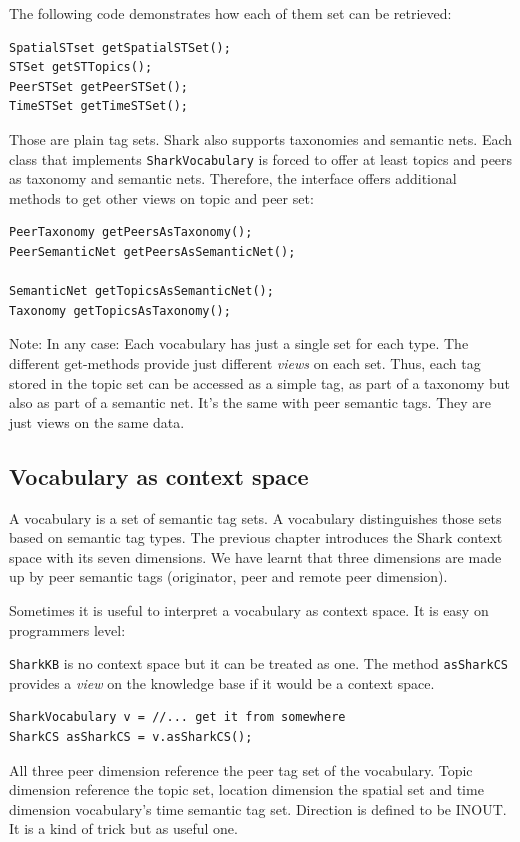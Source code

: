 The following code demonstrates how each of them set can be retrieved:

\begin{verbatim}
SpatialSTset getSpatialSTSet();
STSet getSTTopics();
PeerSTSet getPeerSTSet();
TimeSTSet getTimeSTSet();
\end{verbatim} 

Those are plain tag sets. Shark also supports taxonomies and semantic nets. Each class that implements {\tt SharkVocabulary} is forced to offer at least topics and peers as taxonomy and semantic nets. Therefore, the interface offers additional methods to get other views on topic and peer set:

\begin{verbatim}
PeerTaxonomy getPeersAsTaxonomy();
PeerSemanticNet getPeersAsSemanticNet();

SemanticNet getTopicsAsSemanticNet();
Taxonomy getTopicsAsTaxonomy();
\end{verbatim}

Note: In any case: Each vocabulary has just a single set for each type. The different get-methods provide just different {\it views} on each set. Thus, each tag stored in the topic set can be accessed as a simple tag, as part of a taxonomy but also as part of a semantic net. It's the same with peer semantic tags. They are just views on the same data.

\subsection{Vocabulary as context space}
A vocabulary is a set of semantic tag sets. A vocabulary distinguishes those sets based on semantic tag types. The previous chapter introduces the Shark context space with its seven dimensions. We have learnt that three dimensions are made up by peer semantic tags (originator, peer and remote peer dimension).

Sometimes it is useful to interpret a vocabulary as context space. It is easy on programmers level:

{\tt SharkKB} is no context space but it can be treated as one. The method {\tt asSharkCS} provides a {\it view} on the knowledge base if it would be a context space.

\begin{verbatim}
SharkVocabulary v = //... get it from somewhere
SharkCS asSharkCS = v.asSharkCS();
\end{verbatim}

All three peer dimension reference the peer tag set of the vocabulary. Topic dimension reference the topic set, location dimension the spatial set and time dimension vocabulary's time semantic tag set. Direction is defined to be INOUT.
It is a kind of trick but as useful one.


